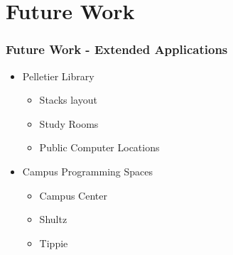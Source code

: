 \documentclass[hyperref={pdfpagelabels=false}]{beamer}
\begin{document}
\section{Future Work} 
\hypertarget{Future Work}{{}}
\begin{frame}
\frametitle{Future Work - Extended Applications}
\begin{itemize}[<+->]
	\item Pelletier Library
	\begin{itemize}
		\item Stacks layout
		\item Study Rooms
		\item Public Computer Locations
	\end{itemize}
	\item Campus Programming Spaces
	\begin{itemize}
		\item Campus Center
		\item Shultz
		\item Tippie
	\end{itemize}
\end{itemize}
\end{frame}
\end{document}
